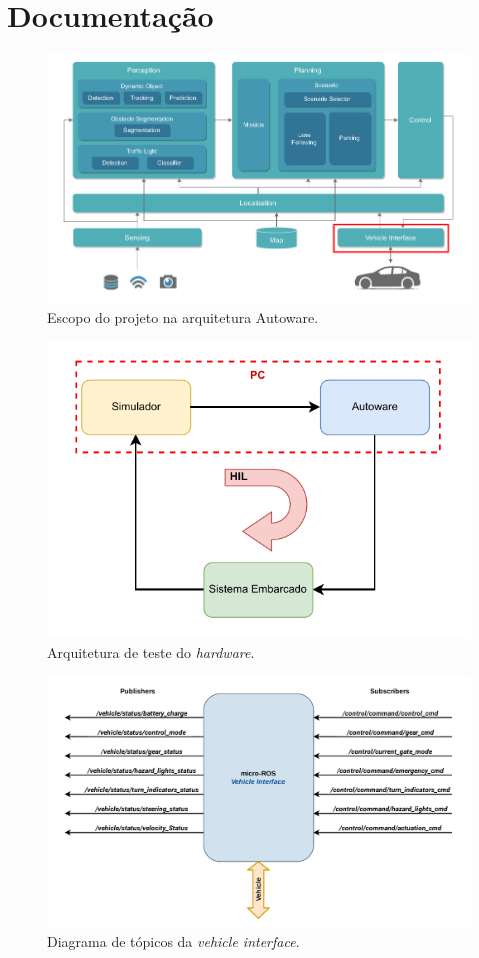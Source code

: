 \clearpage

\section{Documentação}

\begin{figure}[H]
	\centering
	\includegraphics[width=0.75\linewidth]{img/architecture.png}
	\caption{Escopo do projeto na arquitetura Autoware.}
	\label{fig:architecture}
\end{figure}

\begin{figure}[H]
	\centering
	\includegraphics[width=0.55\linewidth]{img/architecture_HIL}
	\caption{Arquitetura de teste do \textit{hardware}.}
	\label{fig:architecture_HIL}
\end{figure}

	\begin{figure}[H]
	\centering
	\includegraphics[width=0.75\linewidth]{img/vehicle_interface-topics}
	\caption{Diagrama de tópicos da \textit{vehicle interface}.}
	\label{fig:vehicleinterface-topics}
\end{figure}

